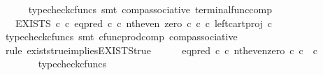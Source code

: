 \begin{isabellebody}
\ \ \ \ \isamarkupfalse%
\ {\isacharparenleft}{\kern0pt}typecheck{\isacharunderscore}{\kern0pt}cfuncs{\isacharcomma}{\kern0pt}\ smt\ comp{\isacharunderscore}{\kern0pt}associative{}\ terminal{\isacharunderscore}{\kern0pt}func{\isacharunderscore}{\kern0pt}comp{\isacharparenright}{\kern0pt}\isanewline
\ \ \isamarkupfalse%
\ \isamarkupfalse%
\ {\isachardoublequoteopen}{\isachardot}{\kern0pt}{\isachardot}{\kern0pt}{\isachardot}{\kern0pt}\ {\isacharequal}{\kern0pt}\ EXISTS\ {\isasymnat}\isactrlsub c\ {\isasymcirc}\isactrlsub c\ {\isacharparenleft}{\kern0pt}{\isacharparenleft}{\kern0pt}eq{\isacharunderscore}{\kern0pt}pred\ {\isasymnat}\isactrlsub c\ {\isasymcirc}\isactrlsub c\ {\isasymlangle}nth{\isacharunderscore}{\kern0pt}even{\isacharcomma}{\kern0pt}\ zero\ {\isasymcirc}\isactrlsub c\ {\isasymbeta}\isactrlbsub {\isasymnat}\isactrlsub c\isactrlesub {\isasymrangle}{\isacharparenright}{\kern0pt}\ {\isasymcirc}\isactrlsub c\ left{\isacharunderscore}{\kern0pt}cart{\isacharunderscore}{\kern0pt}proj\ {\isasymnat}\isactrlsub c\ {\isasymone}{\isacharparenright}{\kern0pt}\isactrlsup {\isasymsharp}{\isachardoublequoteclose}\isanewline
\ \ \ \ \isamarkupfalse%
\ {\isacharparenleft}{\kern0pt}typecheck{\isacharunderscore}{\kern0pt}cfuncs{\isacharcomma}{\kern0pt}\ smt\ cfunc{\isacharunderscore}{\kern0pt}prod{\isacharunderscore}{\kern0pt}comp\ comp{\isacharunderscore}{\kern0pt}associative{}{\isacharparenright}{\kern0pt}\isanewline
\ \ \isamarkupfalse%
\ \isamarkupfalse%
\ {\isachardoublequoteopen}{\isachardot}{\kern0pt}{\isachardot}{\kern0pt}{\isachardot}{\kern0pt}\ {\isacharequal}{\kern0pt}\ {\isasymt}{\isachardoublequoteclose}\isanewline
\ \ \isamarkupfalse%
\ {\isacharparenleft}{\kern0pt}rule\ exists{\isacharunderscore}{\kern0pt}true{\isacharunderscore}{\kern0pt}implies{\isacharunderscore}{\kern0pt}EXISTS{\isacharunderscore}{\kern0pt}true{\isacharparenright}{\kern0pt}\isanewline
\ \ \ \ \isamarkupfalse%
\ {\isachardoublequoteopen}eq{\isacharunderscore}{\kern0pt}pred\ {\isasymnat}\isactrlsub c\ {\isasymcirc}\isactrlsub c\ {\isasymlangle}nth{\isacharunderscore}{\kern0pt}even{\isacharcomma}{\kern0pt}zero\ {\isasymcirc}\isactrlsub c\ {\isasymbeta}\isactrlbsub {\isasymnat}\isactrlsub c\isactrlesub {\isasymrangle}\ {\isacharcolon}{\kern0pt}\ {\isasymnat}\isactrlsub c\ {\isasymrightarrow}\ {\isasymOmega}{\isachardoublequoteclose}\isanewline
\ \ \ \ \ \ \isamarkupfalse%
\ typecheck{\isacharunderscore}{\kern0pt}cfuncs\isanewline

\end{isabellebody}
